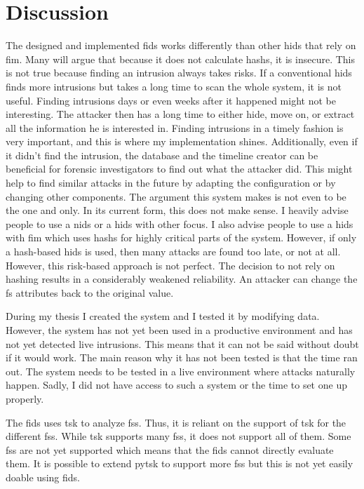 
\chapter{Discussion}
\label{sec:Discussion}


The designed and implemented \gls{fids} works differently than other \gls{hids} that rely on \gls{fim}. Many will argue that because it does not calculate \glspl{hash}, it is insecure. This is not true because finding an \gls{intrusion} always takes risks. If a conventional \gls{hids} finds more \glspl{intrusion} but takes a long time to scan the whole system, it is not useful. Finding \glspl{intrusion} days or even weeks after it happened might not be interesting. The attacker then has a long time to either hide, move on, or extract all the information he is interested in. Finding \glspl{intrusion} in a timely fashion is very important, and this is where my implementation shines. Additionally, even if it didn't find the \gls{intrusion}, the database and the timeline creator can be beneficial for forensic investigators to find out what the attacker did. This might help to find similar attacks in the future by adapting the configuration or by changing other components. The argument this system makes is not even to be the one and only. In its current form, this does not make sense. I heavily advise people to use a \gls{nids} or a \gls{hids} with other focus. I also advise people to use a \gls{hids} with \gls{fim} which uses \glspl{hash} for highly critical parts of the system. However, if only a hash-based \gls{hids} is used, then many attacks are found too late, or not at all. However, this risk-based approach is not perfect. The decision to not rely on hashing results in a considerably weakened reliability. An attacker can change the \gls{fs} attributes back to the original value. 

During my thesis I created the system and I tested it by modifying data. However, the system has not yet been used in a productive environment and has not yet detected live \glspl{intrusion}. This means that it can not be said without doubt if it would work. The main reason why it has not been tested is that the time ran out. The system needs to be tested in a live environment where attacks naturally happen. Sadly, I did not have access to such a system or the time to set one up properly. 

The \gls{fids} uses \gls{tsk} to analyze \glspl{fs}. Thus, it is reliant on the support of \gls{tsk} for the different \glspl{fs}. While \gls{tsk} supports many \glspl{fs}, it does not support all of them. Some \glspl{fs} are not yet supported which means that the \gls{fids} cannot directly evaluate them. It is possible to extend \gls{pytsk} to support more \glspl{fs} but this is not yet easily doable using \gls{fids}. 

